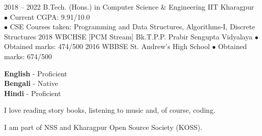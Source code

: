 \documentclass[9pt]{developercv} %
\begin{document}

\begin{entrylist}
	\entry
		{2018 -- 2022}
		{B.Tech. (Hons.) in Computer Science \& Engineering}
		{IIT Kharagpur}
		{$\bullet$ Current CGPA: 9.91/10.0\\
		 $\bullet$ CSE Courses taken: Programming and Data Structures, Algorithms-I, Discrete Structures}
	\entry
		{2018}
		{WBCHSE [PCM Stream]}
		{Bk.T.P.P. Prabir Sengupta Vidyalaya}
		{$\bullet$ Obtained marks: 474/500}
	\entry
		{2016}
		{WBBSE}
		{St. Andrew's High School}
		{$\bullet$ Obtained marks: 674/500}
\end{entrylist}


\begin{minipage}[t]{0.3\textwidth}
	\vspace{-\baselineskip} %

	
	\textbf{English} - Proficient\\
	\textbf{Bengali} - Native\\
	\textbf{Hindi} - Proficient
\end{minipage}
\hfill
\begin{minipage}[t]{0.3\textwidth}
	\vspace{-\baselineskip} %
	
	
	I love reading story books, listening to music and, of course, coding.
\end{minipage}
\hfill
\begin{minipage}[t]{0.3\textwidth}
	\vspace{-\baselineskip} %
	
	
	I am part of NSS and Kharagpur Open Source Society (KOSS).
\end{minipage}

\end{document}
